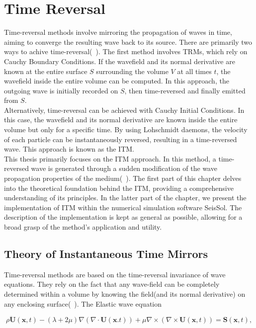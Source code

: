 \chapter{Time Reversal}

Time-reversal methods involve mirroring the propagation of waves in time, aiming to converge the resulting wave back to its source.
There are primarily two ways to achive time-reversal(~\parencite{Fink2017}). The first method involves \ac{TRM}s, which rely on 
Cauchy Boundary Conditions. If the wavefield and its normal derivative are known at the entire surface $S$ surrounding the volume
$V$ at all times $t$, the wavefield inside the entire volume can be computed. In this approach, the outgoing wave is initially 
recorded on $S$, then time-reversed and finally emitted from $S$. \\

Alternatively, time-reversal can be achieved with Cauchy Initial Conditions. In this case, the wavefield and its normal derivative
are known inside the entire volume but only for a specific time. By using Lohschmidt daemons, the velocity of each particle can be
instantaneously reversed, resulting in a time-reversed wave. This approach is known as the \ac{ITM}.\\

This thesis primarily focuses on the \ac{ITM} approach. In this method, a time-reversed wave is generated through a sudden modification of the wave propagation
properties of the medium(~\parencite{Bacot2016}). The first part of this chapter delves into the theoretical foundation behind the \ac{ITM}, providing a comprehensive
understanding of its principles. In the latter part of the chapter, we present the implementation of \ac{ITM} within the numerical simulation software SeisSol. The
description of the implementation is kept as general as possible, allowing for a broad grasp of the method's application and utility.

\section{Theory of Instantaneous Time Mirrors}

Time-reversal methods are based on the time-reversal invariance of wave equations. They rely on the fact that any wave-field can be completely determined within
a volume by knowing the field(and its normal derivative) on any enclosing surface(~\parencite{Bacot2016}). The Elastic wave equation

\begin{equation}
    \rho \ddot{\mathbf{U}} \left( \mathbf{x}, t\right) - \left( \lambda + 2 \mu \right) \nabla \left(\nabla \cdot \mathbf{U}\left(\mathbf{x}. t\right)\right) 
    + \mu \nabla \times \left(\nabla \times \mathbf{U}\left(\mathbf{x},t\right)\right) = \mathbf{S}\left(\mathbf{x},t\right),
\end{equation}

